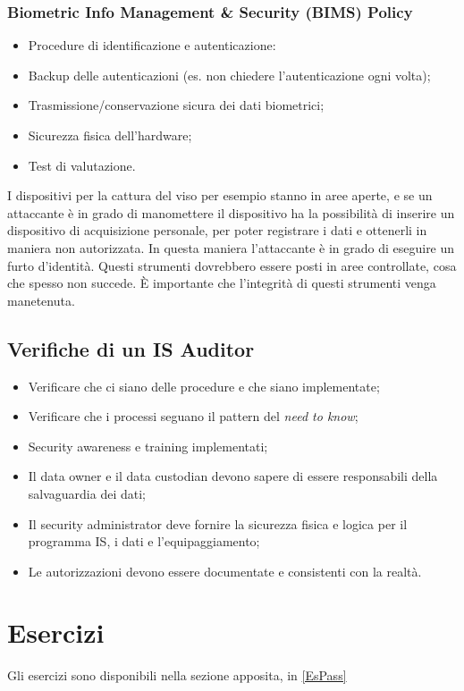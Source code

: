 \subsubsection{Biometric Info Management \& Security (BIMS) Policy}

\begin{itemize}
 \item Procedure di identificazione e autenticazione:
 \item Backup delle autenticazioni (es. non chiedere l'autenticazione ogni
 volta);
 \item Trasmissione/conservazione sicura dei dati biometrici;
 \item Sicurezza fisica dell'hardware;
 \item Test di valutazione.
\end{itemize}

I dispositivi per la cattura del viso per esempio stanno in aree aperte, e se
un attaccante è in grado di manomettere il dispositivo ha la possibilità di
inserire un dispositivo di acquisizione personale, per poter registrare i dati
e ottenerli in maniera non autorizzata. In questa maniera l'attaccante è in
grado di eseguire un furto d'identità. Questi strumenti dovrebbero essere posti
in aree controllate, cosa che spesso non succede. È importante che l'integrità
di questi strumenti venga manetenuta.

\subsection{Verifiche di un IS Auditor}
\begin{itemize}
 \item Verificare che ci siano delle procedure e che siano implementate;
 \item Verificare che i processi seguano il pattern del \textit{need to know};
 \item Security awareness e training implementati;
 \item Il data owner e il data custodian devono sapere di essere responsabili 
 della salvaguardia dei dati;
 \item Il security administrator deve fornire la sicurezza fisica e logica per 
 il programma IS, i dati e l'equipaggiamento;
 \item Le autorizzazioni devono essere documentate e consistenti con la realtà.
\end{itemize}


\section{Esercizi}

Gli esercizi sono disponibili nella sezione apposita, in \ref{EsPass}
